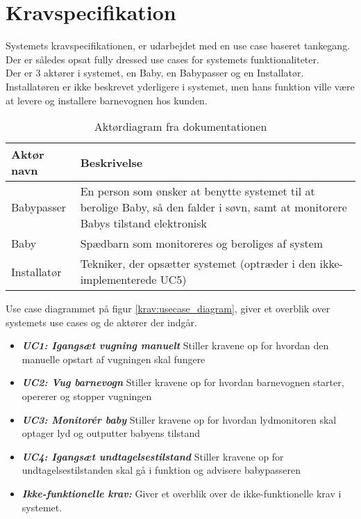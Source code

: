 \chapter{Kravspecifikation}

Systemets kravspecifikationen, er udarbejdet med en use case baseret tankegang. Der er således opsat fully dressed use cases for systemets funktionaliteter. \\
Der er 3 aktører i systemet, en Baby, en Babypasser og en Installatør. Installatøren er ikke beskrevet yderligere i systemet, men hans funktion ville være at levere og installere barnevognen hos kunden.

\begin{table}[!htbp] \centering
	\caption{Aktørdiagram fra dokumentationen}
	\label{krav:aktoerdiagram}
	\begin{tabular}{|p{2.5cm}|p{11.5cm}|}
	\hline
		\textbf{Aktør navn} & \textbf{Beskrivelse} \\\hline
		Babypasser 
		& En person som ønsker at benytte systemet til at 
		  berolige Baby, så den falder i søvn, samt at monitorere Babys tilstand elektronisk
		\\\hline
		Baby 
		& Spædbarn som monitoreres og beroliges af system
		\\\hline
		Installatør
		& Tekniker, der opsætter systemet (optræder i den ikke-implementerede UC5)
		\\\hline
	\end{tabular}
\end{table}

Use case diagrammet på figur \ref{krav:usecase_diagram}, giver et overblik over systemets use cases og de aktører der indgår.


\begin{itemize}
\item \textbf{\textit{UC1: Igangsæt vugning manuelt}} Stiller kravene op for hvordan den manuelle opstart af vugningen skal fungere
\item \textbf{\textit{UC2: Vug barnevogn}} Stiller kravene op for hvordan barnevognen starter, opererer og stopper vugningen
\item \textbf{\textit{UC3: Monitorér baby}} Stiller kravene op for hvordan lydmonitoren skal optager lyd og outputter babyens tilstand
\item \textbf{\textit{UC4: Igangsæt undtagelsestilstand}} Stiller kravene op for undtagelsestilstanden skal gå i funktion og advisere babypasseren
\item \textbf{\textit{Ikke-funktionelle krav:}} Giver et overblik over de ikke-funktionelle krav i systemet. 
\end{itemize}


